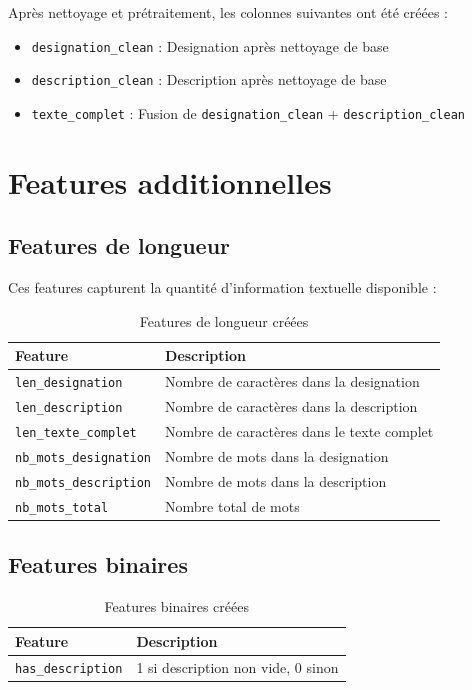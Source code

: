 \documentclass[12pt,a4paper]{article}
\begin{document}
Après nettoyage et prétraitement, les colonnes suivantes ont été créées :

\begin{itemize}
    \item \texttt{designation\_clean} : Designation après nettoyage de base
    \item \texttt{description\_clean} : Description après nettoyage de base
    \item \texttt{texte\_complet} : Fusion de \texttt{designation\_clean} + \texttt{description\_clean}
\end{itemize}

\section{Features additionnelles}

\subsection{Features de longueur}

Ces features capturent la quantité d'information textuelle disponible :

\begin{table}[H]
\centering
\begin{tabular}{@{}lp{10cm}@{}}
\toprule
\textbf{Feature} & \textbf{Description} \\
\midrule
\texttt{len\_designation} & Nombre de caractères dans la designation \\
\texttt{len\_description} & Nombre de caractères dans la description \\
\texttt{len\_texte\_complet} & Nombre de caractères dans le texte complet \\
\texttt{nb\_mots\_designation} & Nombre de mots dans la designation \\
\texttt{nb\_mots\_description} & Nombre de mots dans la description \\
\texttt{nb\_mots\_total} & Nombre total de mots \\
\bottomrule
\end{tabular}
\caption{Features de longueur créées}
\label{tab:features_longueur}
\end{table}

\subsection{Features binaires}

\begin{table}[H]
\centering
\begin{tabular}{@{}lp{10cm}@{}}
\toprule
\textbf{Feature} & \textbf{Description} \\
\midrule
\texttt{has\_description} & 1 si description non vide, 0 sinon \\
\bottomrule
\end{tabular}
\caption{Features binaires créées}
\label{tab:features_binaires}
\end{table}
\end{document}
